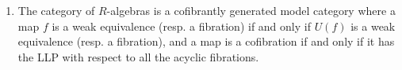 \begin{refsection}
\begin{thm}
\begin{enumerate}
\item The category of $R$-algebras is a cofibrantly generated model category where a map $f$ is a weak equivalence (resp. a fibration) if and only if $U(f)$ is a weak equivalence (resp. a fibration), and a map is a cofibration if and only if it has the LLP with respect to all the acyclic fibrations.
\end{enumerate}
\end{thm}

\printbibliography[heading = local]

\end{refsection}
